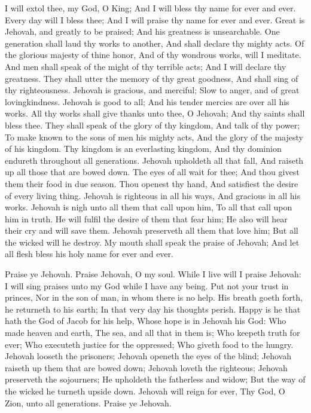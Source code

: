 I will extol thee, my God, O King; And I will bless thy name for ever and ever.  Every day will I bless thee; And I will praise thy name for ever and ever.  Great is Jehovah, and greatly to be praised; And his greatness is unsearchable.  One generation shall laud thy works to another, And shall declare thy mighty acts.  Of the glorious majesty of thine honor, And of thy wondrous works, will I meditate.  And men shall speak of the might of thy terrible acts; And I will declare thy greatness.  They shall utter the memory of thy great goodness, And shall sing of thy righteousness.  Jehovah is gracious, and merciful; Slow to anger, and of great lovingkindness.  Jehovah is good to all; And his tender mercies are over all his works.  All thy works shall give thanks unto thee, O Jehovah; And thy saints shall bless thee.  They shall speak of the glory of thy kingdom, And talk of thy power;  To make known to the sons of men his mighty acts, And the glory of the majesty of his kingdom.  Thy kingdom is an everlasting kingdom, And thy dominion endureth throughout all generations.  Jehovah upholdeth all that fall, And raiseth up all those that are bowed down.  The eyes of all wait for thee; And thou givest them their food in due season.  Thou openest thy hand, And satisfiest the desire of every living thing.  Jehovah is righteous in all his ways, And gracious in all his works.  Jehovah is nigh unto all them that call upon him, To all that call upon him in truth.  He will fulfil the desire of them that fear him; He also will hear their cry and will save them.  Jehovah preserveth all them that love him; But all the wicked will he destroy.  My mouth shall speak the praise of Jehovah; And let all flesh bless his holy name for ever and ever. 

Praise ye Jehovah. Praise Jehovah, O my soul.  While I live will I praise Jehovah: I will sing praises unto my God while I have any being.  Put not your trust in princes, Nor in the son of man, in whom there is no help.  His breath goeth forth, he returneth to his earth; In that very day his thoughts perish.  Happy is he that hath the God of Jacob for his help, Whose hope is in Jehovah his God:  Who made heaven and earth, The sea, and all that in them is; Who keepeth truth for ever;  Who executeth justice for the oppressed; Who giveth food to the hungry. Jehovah looseth the prisoners;  Jehovah openeth the eyes of the blind; Jehovah raiseth up them that are bowed down; Jehovah loveth the righteous;  Jehovah preserveth the sojourners; He upholdeth the fatherless and widow; But the way of the wicked he turneth upside down.  Jehovah will reign for ever, Thy God, O Zion, unto all generations. Praise ye Jehovah. 

